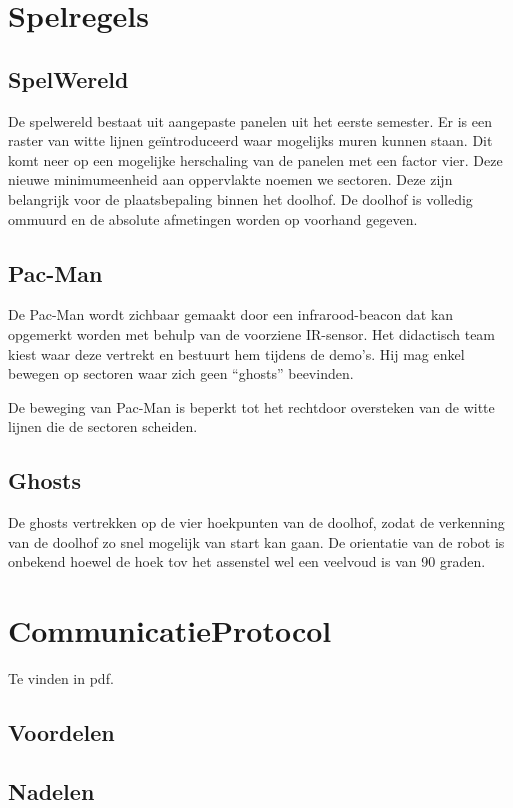 \documentclass[12pt,a4paper]{report}
\begin{document}
\section{Spelregels}

\subsection{SpelWereld}

De spelwereld bestaat uit aangepaste panelen uit het eerste semester. Er is een raster van witte lijnen ge\"introduceerd waar mogelijks muren kunnen staan. Dit komt neer op een mogelijke herschaling van de panelen met een factor vier. Deze nieuwe minimumeenheid aan oppervlakte noemen we sectoren. Deze zijn belangrijk voor de plaatsbepaling binnen het doolhof. De doolhof is volledig ommuurd en de absolute afmetingen worden op voorhand gegeven.

\subsection{Pac-Man}

De Pac-Man wordt zichbaar gemaakt door een infrarood-beacon dat kan opgemerkt worden met behulp van de voorziene IR-sensor. Het didactisch team kiest waar deze vertrekt en bestuurt hem tijdens de demo's. Hij mag enkel bewegen op sectoren waar zich geen ``ghosts'' beevinden.

De beweging van Pac-Man is beperkt tot het rechtdoor oversteken van de witte lijnen die de sectoren scheiden.

\subsection{Ghosts}

De ghosts vertrekken op de vier hoekpunten van de doolhof, zodat de verkenning van de doolhof zo snel mogelijk van start kan gaan. De orientatie van de robot is onbekend hoewel de hoek tov het assenstel wel een veelvoud is van 90 graden.


\section{CommunicatieProtocol}

Te vinden in pdf.
\subsection{Voordelen}

\subsection{Nadelen}
\end{document}
